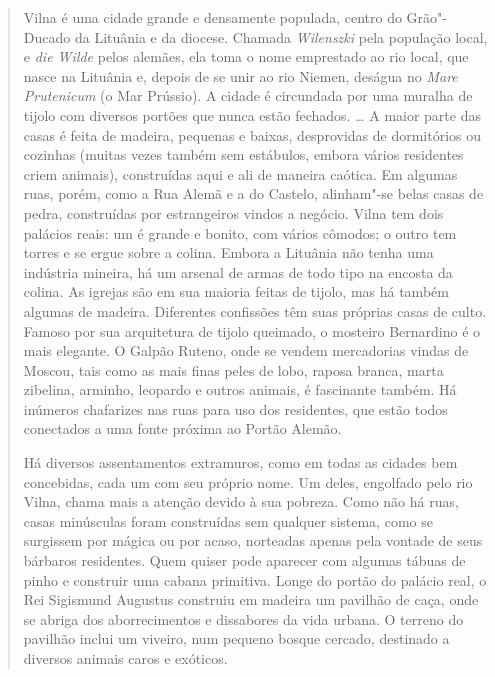 \begin{quote}
Vilna é uma cidade grande e densamente populada, centro do Grão"-Ducado
da Lituânia e da diocese. Chamada \emph{Wilenszki} pela população local,
e \emph{die Wilde} pelos alemães, ela toma o nome emprestado ao rio
local, que nasce na Lituânia e, depois de se unir ao rio Niemen, deságua
no \emph{Mare Prutenicum} (o Mar Prússio). A cidade é circundada por uma
muralha de tijolo com diversos portões que nunca estão fechados.
\ldots{} A maior parte das casas é feita de madeira, pequenas e baixas,
desprovidas de dormitórios ou cozinhas (muitas vezes também sem
estábulos, embora vários residentes criem animais), construídas aqui e
ali de maneira caótica. Em algumas ruas, porém, como a Rua Alemã e a do
Castelo, alinham"-se belas casas de pedra, construídas por estrangeiros
vindos a negócio. Vilna tem dois palácios reais: um é grande e bonito,
com vários cômodos; o outro tem torres e se ergue sobre a colina. Embora
a Lituânia não tenha uma indústria mineira, há um arsenal de armas de
todo tipo na encosta da colina. As igrejas são em sua maioria feitas de
tijolo, mas há também algumas de madeira. Diferentes confissões têm suas
próprias casas de culto. Famoso por sua arquitetura de tijolo queimado,
o mosteiro Bernardino é o mais elegante. O Galpão Ruteno, onde se vendem
mercadorias vindas de Moscou, tais como as mais finas peles de lobo,
raposa branca, marta zibelina, arminho, leopardo e outros animais, é
fascinante também. Há inúmeros chafarizes nas ruas para uso dos
residentes, que estão todos conectados a uma fonte próxima ao Portão
Alemão.

Há diversos assentamentos extramuros, como em todas as cidades bem
concebidas, cada um com seu próprio nome. Um deles, engolfado pelo rio
Vilna, chama mais a atenção devido à sua pobreza. Como não há ruas,
casas minúsculas foram construídas sem qualquer sistema, como se
surgissem por mágica ou por acaso, norteadas apenas pela vontade de seus
bárbaros residentes. Quem quiser pode aparecer com algumas tábuas de
pinho e construir uma cabana primitiva. Longe do portão do palácio real,
o Rei Sigismund Augustus construiu em madeira um pavilhão de caça, onde
se abriga dos aborrecimentos e dissabores da vida urbana. O terreno do
pavilhão inclui um viveiro, num pequeno bosque cercado, destinado a
diversos animais caros e exóticos.

%


\end{quote}
